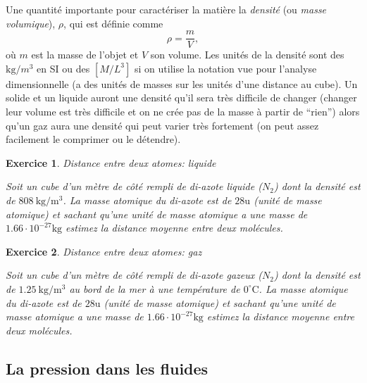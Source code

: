 \documentclass[a4paper,12pt]{book}
\newtheorem{exercice}{Exercice}
\newcommand{\m}{\mathrm{m}}
\newcommand{\kg}{\mathrm{kg}}
\newcommand{\C}{\mathrm{C}}
\begin{document}
Une quantité importante pour caractériser la matière la \textit{densité} (ou \textit{masse volumique}), $\rho$, qui est définie comme
\begin{equation}
 \rho=\frac{m}{V},
\end{equation}
où $m$ est la masse de l'objet et $V$ son volume. Les unités de la densité sont des $\kg/m^3$ en SI ou des $[M/L^3]$ si on utilise la notation vue pour 
l'analyse dimensionnelle (a des unités de masses sur les unités d'une distance au cube). 
Un solide et un liquide auront une densité qu'il sera très difficile de changer (changer leur volume est
très difficile et on ne crée pas de la masse à partir de ``rien'') 
alors qu'un gaz aura une densité qui peut varier très fortement (on peut assez facilement le comprimer ou le détendre).


\begin{exercice}{Distance entre deux atomes: liquide}

Soit un cube d'un mètre de côté rempli de di-azote liquide ($N_2$) dont la densité est de 
$808\ \kg/\m^3$. La masse atomique du di-azote est de $28\mathrm{u}$ (unité de masse atomique) et 
sachant qu'une unité de masse atomique a une masse de $1.66\cdot 10^{-27}\kg$ estimez
la distance moyenne entre deux molécules.
\end{exercice}

\begin{exercice}{Distance entre deux atomes: gaz}

Soit un cube d'un mètre de côté rempli de di-azote gazeux ($N_2$) dont la densité est de 
$1.25\ \kg/\m^3$ au bord de la mer à une température de $0^\circ\C$. La masse atomique du di-azote est de $28\mathrm{u}$ (unité de masse atomique) et 
sachant qu'une unité de masse atomique a une masse de $1.66\cdot 10^{-27}\kg$ estimez
la distance moyenne entre deux molécules.
\end{exercice}

\subsection{La pression dans les fluides}
\end{document}

